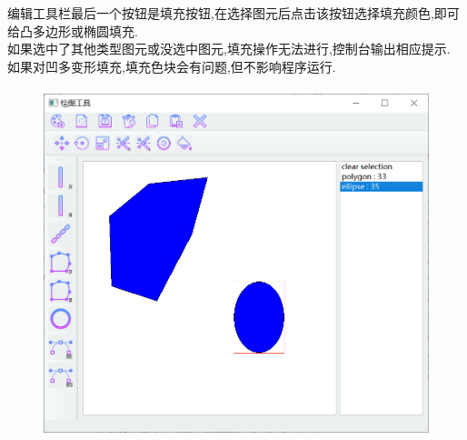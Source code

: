 \documentclass[a4paper,UTF8]{article}
\theoremstyle{definition}
\begin{document}
\indent 编辑工具栏最后一个按钮是填充按钮,在选择图元后点击该按钮选择填充颜色,即可给凸多边形或椭圆填充.\\
\indent 如果选中了其他类型图元或没选中图元,填充操作无法进行,控制台输出相应提示.\\
\indent 如果对凹多变形填充,填充色块会有问题,但不影响程序运行.
\begin{figure}[H]
	\includegraphics[width=5in,height=4in]{padding.png}
\end{figure}
\end{document}
